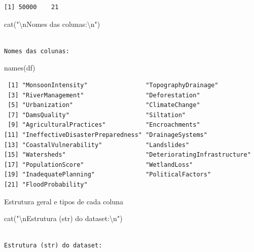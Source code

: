 \documentclass[
  letterpaper,
  DIV=11,
  numbers=noendperiod]{scrartcl}
\newenvironment{Shaded}{\begin{snugshade}}{\end{snugshade}}
\newcommand{\FunctionTok}[1]{\textcolor[rgb]{0.28,0.35,0.67}{#1}}
\newcommand{\NormalTok}[1]{\textcolor[rgb]{0.00,0.23,0.31}{#1}}
\newcommand{\SpecialCharTok}[1]{\textcolor[rgb]{0.37,0.37,0.37}{#1}}
\newcommand{\StringTok}[1]{\textcolor[rgb]{0.13,0.47,0.30}{#1}}
\begin{document}
\begin{verbatim}
[1] 50000    21
\end{verbatim}

\begin{Shaded}
\begin{Highlighting}[]
\FunctionTok{cat}\NormalTok{(}\StringTok{"}\SpecialCharTok{\textbackslash{}n}\StringTok{Nomes das colunas:}\SpecialCharTok{\textbackslash{}n}\StringTok{"}\NormalTok{)}
\end{Highlighting}
\end{Shaded}

\begin{verbatim}

Nomes das colunas:
\end{verbatim}

\begin{Shaded}
\begin{Highlighting}[]
\FunctionTok{names}\NormalTok{(df)}
\end{Highlighting}
\end{Shaded}

\begin{verbatim}
 [1] "MonsoonIntensity"                "TopographyDrainage"             
 [3] "RiverManagement"                 "Deforestation"                  
 [5] "Urbanization"                    "ClimateChange"                  
 [7] "DamsQuality"                     "Siltation"                      
 [9] "AgriculturalPractices"           "Encroachments"                  
[11] "IneffectiveDisasterPreparedness" "DrainageSystems"                
[13] "CoastalVulnerability"            "Landslides"                     
[15] "Watersheds"                      "DeterioratingInfrastructure"    
[17] "PopulationScore"                 "WetlandLoss"                    
[19] "InadequatePlanning"              "PoliticalFactors"               
[21] "FloodProbability"               
\end{verbatim}

Estrutura geral e tipos de cada coluna

\begin{Shaded}
\begin{Highlighting}[]
\FunctionTok{cat}\NormalTok{(}\StringTok{"}\SpecialCharTok{\textbackslash{}n}\StringTok{Estrutura (str) do dataset:}\SpecialCharTok{\textbackslash{}n}\StringTok{"}\NormalTok{)}
\end{Highlighting}
\end{Shaded}

\begin{verbatim}

Estrutura (str) do dataset:
\end{verbatim}
\end{document}
